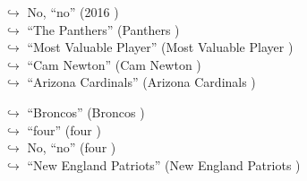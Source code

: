 \documentclass[11pt,a4paper, onecolumn]{article}
\begin{document}
\begin{figure}[t]
\begin{tcolorbox}[boxsep=0pt,left=5pt,right=0pt,top=2pt,colback = yellow!5]
\begin{dialogue}
\colorbox{pink!25}{$\hookrightarrow$}
\colorbox{red!25}{No,}
{ ``no'' (2016 ) }
\\
\colorbox{pink!25}{$\hookrightarrow$}
{ ``The Panthers'' (Panthers ) }
\\
\colorbox{pink!25}{$\hookrightarrow$}
{ ``Most Valuable Player'' (Most Valuable Player ) }
\\
\colorbox{pink!25}{$\hookrightarrow$}
{ ``Cam Newton'' (Cam Newton ) }
\\
\colorbox{pink!25}{$\hookrightarrow$}
{ ``Arizona Cardinals'' (Arizona Cardinals ) }
 \end{dialogue}\end{tcolorbox}\end{figure}\begin{figure}[t] \small \begin{tcolorbox}[boxsep=0pt,left=5pt,right=0pt,top=2pt,colback = yellow!5] \begin{dialogue}
 \small 
\colorbox{pink!25}{$\hookrightarrow$}
{ ``Broncos'' (Broncos ) }
\\
\colorbox{pink!25}{$\hookrightarrow$}
{ ``four'' (four ) }
\\
\colorbox{pink!25}{$\hookrightarrow$}
\colorbox{red!25}{No,}
{ ``no'' (four ) }
\\
\colorbox{pink!25}{$\hookrightarrow$}
{ ``New England Patriots'' (New England Patriots ) }
\\
 \end{dialogue}\end{tcolorbox}\end{figure}
\end{document}
